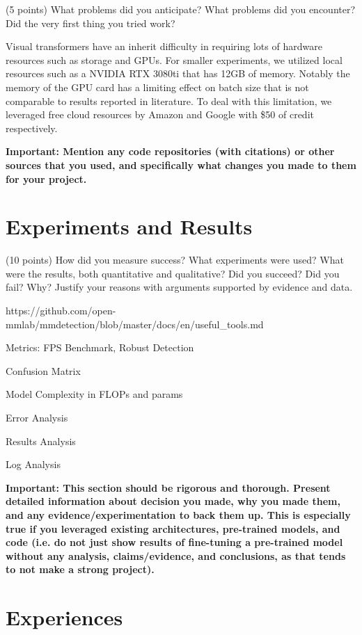 \documentclass[10pt,twocolumn,letterpaper]{article}
\begin{document}
(5 points) What problems did you anticipate? What problems did you encounter? Did the very first thing you tried work?

Visual transformers have an inherit difficulty in requiring lots of hardware resources such as storage and GPUs. For smaller experiments, we utilized local resources such as a NVIDIA RTX 3080ti that has 12GB of memory. Notably the memory of the GPU card has a limiting effect on batch size that is not comparable to results reported in literature. To deal with this limitation, we leveraged free cloud resources by Amazon and Google with \$50 of credit respectively.

\textbf{Important: Mention any code repositories (with citations) or other sources that you used, and specifically what changes you made to them for your project. }

\section{Experiments and Results}

(10 points) How did you measure success? What experiments were used? What were the results, both quantitative and qualitative? Did you succeed? Did you fail? Why? Justify your reasons with arguments supported by evidence and data.

https://github.com/open-mmlab/mmdetection/blob/master/docs/en/useful_tools.md

Metrics: FPS Benchmark, Robust Detection

Confusion Matrix

Model Complexity in FLOPs and params

Error Analysis

Results Analysis


Log Analysis


\textbf{Important: This section should be rigorous and thorough. Present detailed information about decision you made, why you made them, and any evidence/experimentation to back them up. This is especially true if you leveraged existing architectures, pre-trained models, and code (i.e. do not just show results of fine-tuning a pre-trained model without any analysis, claims/evidence, and conclusions, as that tends to not make a strong project). }

\section{Experiences}
\end{document}
